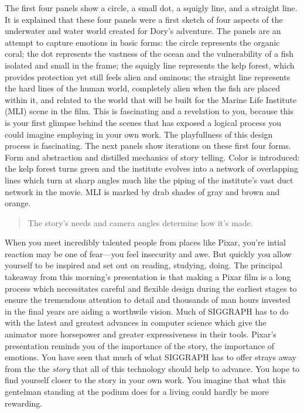 \documentclass[../main.tex]{subfiles}
\begin{document}
The first four panels show a circle, a small dot, a squigly line, and a straight line. It is explained that these four panels were a first sketch of four aspects of the underwater and water world created for Dory's adventure. The panels are an attempt to capture emotions in basic forms: the circle represents the organic coral; the dot represents the vastness of the ocean and the vulnerability of a fish isolated and small in the frame; the squigly line represents the kelp forest, which provides protection yet still feels alien and ominous; the straight line represents the hard lines of the human world, completely alien when the fish are placed within it, and related to the world that will be built for the Marine Life Institute (MLI) scene in the film. This is fascinating and a revelation to you, because this is your first glimpse behind the scenes that has exposed a logical process you could imagine employing in your own work. The playfullness of this design process is fascinating. The next panels show iterations on these first four forms. Form and abstraction and distilled mechanics of story telling. Color is introduced: the kelp forest turns green and the institute evolves into a network of overlapping lines which turn at sharp angles much like the piping of the institute's vast duct network in the movie. MLI is marked by drab shades of gray and brown and orange.

\begin{quotation}
The story's needs and camera angles determine how it's made.
\end{quotation}

When you meet incredibly talented people from places like Pixar, you're intial reaction may be one of fear---you feel insecurity and awe. But quickly you allow yourself to be inspired and set out on reading, studying, doing. The principal takeaway from this morning's presentation is that making a Pixar film is a long process which necessitates careful and flexible design during the earliest stages to ensure the tremendous attention to detail and thousands of man hours invested in the final years are aiding a worthwile vision. Much of SIGGRAPH has to do with the latest and greatest advances in computer science which give the animator more horsepower and greater expressiveness in their tools. Pixar's presentation reminds you of the importance of the story, the importance of emotions. You have seen that much of what SIGGRAPH has to offer strays away from the the \textit{story} that all of this technology should help to advance. You hope to find yourself closer to the story in your own work. You imagine that what this gentelman standing at the podium does for a living could hardly be more rewarding.
\end{document}
